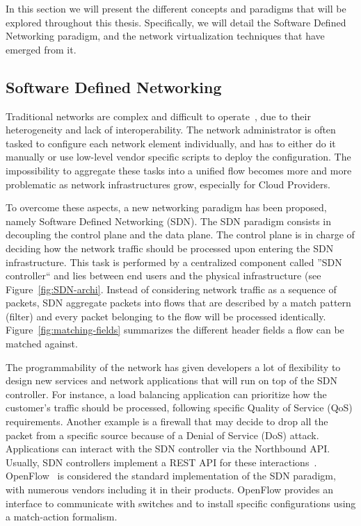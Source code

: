 In this section we will present the different concepts and paradigms that will be explored throughout this thesis.
Specifically, we will detail the Software Defined Networking paradigm, and the network virtualization techniques that have emerged from it.

\subsection{Software Defined Networking}

Traditional networks are complex and difficult to operate~\cite{complexnetworks}, due to their heterogeneity and lack of interoperability. The network administrator is often tasked to configure each network element individually, and has to either do it manually or use low-level vendor specific scripts to deploy the configuration. The impossibility to aggregate these tasks into a unified flow becomes more and more problematic as network infrastructures grow, especially for Cloud Providers.

To overcome these aspects, a new networking paradigm has been proposed, namely Software Defined Networking (SDN).
The SDN paradigm consists in decoupling the control plane and the data plane.
The control plane is in charge of deciding how the network traffic should be processed upon entering the SDN infrastructure.
This task is performed by a centralized component called ''SDN controller`` and lies between end users and the physical infrastructure (see Figure~\ref{fig:SDN-archi}. Instead of considering network traffic as a sequence of packets, SDN aggregate packets into flows that are described by a match pattern (filter) and every packet belonging to the flow will be processed identically. Figure~\ref{fig:matching-fields} summarizes the different header fields a flow can be matched against.



The programmability of the network has given developers a lot of flexibility to design new services and network applications that will run on top of the SDN controller.
For instance, a load balancing application can prioritize how the customer's traffic should be processed, following specific Quality of Service (QoS) requirements.
Another example is a firewall that may decide to drop all the packet from a specific source because of a Denial of Service (DoS) attack.
Applications can interact with the SDN controller via the Northbound API.
Usually, SDN controllers implement a REST API for these interactions~\cite{onos-Berde2014a,opendaylight,floodlight}.
OpenFlow~\cite{Openflow-McKeown2008} is considered the standard implementation of the SDN paradigm, with numerous vendors including it in their products.
OpenFlow provides an interface to communicate with switches and to install specific configurations using a match-action formalism.

